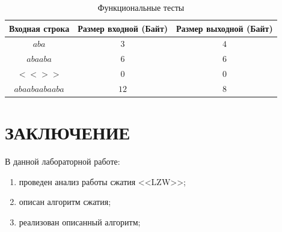 \begin{table}[ht!]
	\begin{center}
		\captionsetup{justification=raggedright,singlelinecheck=off}
		\caption{\label{tbl:functional_test} Функциональные тесты}
		\begin{tabular}{|c|c|c|}
			\hline
			Входная строка & Размер входной (Байт) & Размер выходной (Байт) \\ 
			\hline
			$aba$ & $3$ & $4$ \\
			$abaaba$  & $6$ & $6$\\
			$<<>>$  & $0$ & 0\\
      $abaabaabaaba$ & $12$ & 8 \\
			\hline
		\end{tabular}
	\end{center}
\end{table}

\clearpage
\section*{\large{ЗАКЛЮЧЕНИЕ}}
В данной лабораторной работе:
\begin{enumerate}
    \item проведен анализ работы сжатия <<LZW>>;
    \item описан алгоритм сжатия;
    \item реализован описанный алгоритм;
\end{enumerate}